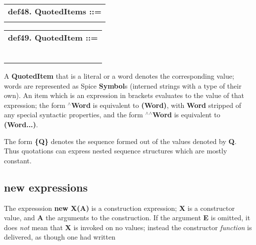 \documentclass{report}
\begin{document}
\begin{tabular}{l}
{\bf def48. QuotedItems ::= }\\ 
\hspace*{3mm}{\tt QuotedItem*} \\ 
\end{tabular}



\begin{tabular}{l}
{\bf def49. QuotedItem ::= }\\ 
\hspace*{3mm}{\tt Word} \\ 
\hspace*{3mm}{\tt  $\mid$ "\{" QuotedItems "\}"} \\ 
\hspace*{3mm}{\tt  $\mid$ "(" Expr ")"} \\ 
\hspace*{3mm}{\tt  $\mid$ "$^\wedge$" Word} \\ 
\hspace*{3mm}{\tt  $\mid$ "$^\wedge$$^\wedge$" Word} \\ 
\hspace*{3mm}{\tt  $\mid$ Literal} \\ 
\end{tabular}



A {\bf QuotedItem} that is a literal or a word denotes the corresponding value;
words are represented as Spice {\bf Symbol}s (interned strings with a type of
their own). An item which is an expression in brackets evaluates to the
value of that expression; the form {\bf $^\wedge$Word} is equivalent to {\bf (Word)},
with {\bf Word} stripped of any special syntactic properties, and the form
{\bf $^\wedge$$^\wedge$Word} is equivalent to {\bf (Word...)}.

The form {\bf \{Q\}} denotes the sequence formed out of the values denoted by {\bf Q}.
Thus quotations can express nested sequence structures which are mostly
constant.

\subsection{new expressions}


The expresssion {\bf new X(A)} is a construction expression; {\bf X} is a constructor
value, and {\bf A} the arguments to the construction. If the argument {\bf E} is
omitted, it does {\em not} mean that {\bf X} is invoked on no values; instead
the constructor {\em function} is delivered, as though one had written
\end{document}
